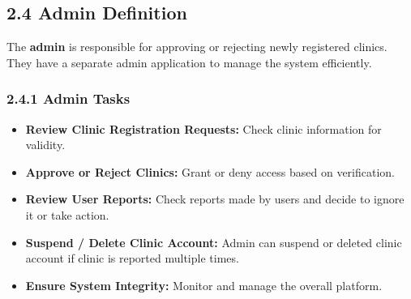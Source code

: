\documentclass[12pt]{report}
\begin{document}
\vspace{0.5cm}


\subsection*{\textbf{2.4 Admin Definition}}

\noindent The \textbf{admin} is responsible for approving or rejecting newly registered clinics. They have a separate admin application to manage the system efficiently.

\subsubsection*{\textbf{2.4.1 Admin Tasks}}
\begin{itemize}
	\item \textbf{Review Clinic Registration Requests:} Check clinic information for validity.
	\item \textbf{Approve or Reject Clinics:} Grant or deny access based on verification.
	\item \textbf{Review User Reports:} Check reports made by users and decide to ignore it or take action.
	\item \textbf{Suspend / Delete Clinic Account:} Admin can suspend or deleted clinic account if clinic is reported multiple times.
	\item \textbf{Ensure System Integrity:} Monitor and manage the overall platform.
\end{itemize}
\end{document}
